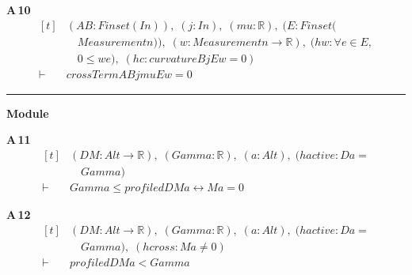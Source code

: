 \noindent\textbf{A\,10}\quad{}
{\footnotesize\[ \begin{aligned}[t]
&(\mathit{A} \mathit{B} : \mathit{Finset} (\mathit{I} \mathit{n})),\; (\mathit{j} : \mathit{I} \mathit{n}),\; (\mathit{mu} : \mathbb{R} ),\; (\mathit{E} : \mathit{Finset} (\\
&\quad \mathit{Measurement} \mathit{n})),\; (\mathit{w} : \mathit{Measurement} \mathit{n} \to \mathbb{R} ),\; (\mathit{hw} : \forall \mathit{e} \in \mathit{E},\\
&\quad 0 \leq \mathit{w} \mathit{e}),\; (\mathit{hc} : \mathit{curvature} \mathit{B} \mathit{j} \mathit{E} \mathit{w}=0)\\
\vdash\;&\mathit{crossTerm} \mathit{A} \mathit{B} \mathit{j} \mathit{mu} \mathit{E} \mathit{w}=0
\end{aligned} \]}

\vspace{4pt}\noindent\rule{\columnwidth}{0.4pt}\par\vspace{2pt}
\noindent\textbf{Module }\par\vspace{3pt}

\noindent\textbf{A\,11}\quad{}
{\footnotesize\[ \begin{aligned}[t]
&(\mathit{D} \mathit{M} : \mathit{Alt} \to \mathbb{R} ),\; (\mathit{Gamma} : \mathbb{R} ),\; (\mathit{a} : \mathit{Alt}),\; (\mathit{hactive} : \mathit{D} \mathit{a} =\\
&\quad \mathit{Gamma})\\
\vdash\;&\mathit{Gamma} \leq \mathit{profiled} \mathit{D} \mathit{M} \mathit{a} \leftrightarrow \mathit{M} \mathit{a} = 0
\end{aligned} \]}

\noindent\textbf{A\,12}\quad{}
{\footnotesize\[ \begin{aligned}[t]
&(\mathit{D} \mathit{M} : \mathit{Alt} \to \mathbb{R} ),\; (\mathit{Gamma} : \mathbb{R} ),\; (\mathit{a} : \mathit{Alt}),\; (\mathit{hactive} : \mathit{D} \mathit{a} =\\
&\quad \mathit{Gamma}),\; (\mathit{hcross} : \mathit{M} \mathit{a} \neq 0)\\
\vdash\;&\mathit{profiled} \mathit{D} \mathit{M} \mathit{a} < \mathit{Gamma}
\end{aligned} \]}

